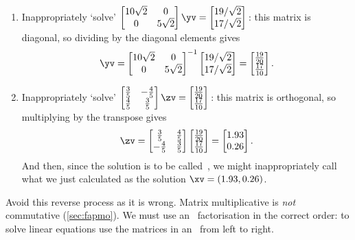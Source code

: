 \begin{example}
\begin{enumerate}
\item Inappropriately `solve' \(\begin{bmatrix} 10\sqrt2&0\\0&5\sqrt2 \end{bmatrix}\yv=\begin{bmatrix} 19/\sqrt2\\17/\sqrt2 \end{bmatrix}\)\,:  this matrix is diagonal, so dividing by the diagonal elements gives 
\begin{equation*}
\yv=\begin{bmatrix} 10\sqrt2&0\\0&5\sqrt2 \end{bmatrix}^{-1}
\begin{bmatrix} 19/\sqrt2\\17/\sqrt2 \end{bmatrix}
=\begin{bmatrix} \frac{19}{20}\\\frac{17}{10} \end{bmatrix}.
\end{equation*}

\item Inappropriately `solve' \(\begin{bmatrix} \frac35&-\frac45\\\frac45&\frac35 \end{bmatrix}\zv=\begin{bmatrix} \frac{19}{20}\\\frac{17}{10} \end{bmatrix}\)\,: this matrix is orthogonal, so multiplying by the transpose gives 
\begin{equation*}
\zv=\begin{bmatrix} \frac35&\frac45\\-\frac45&\frac35 \end{bmatrix}
\begin{bmatrix} \frac{19}{20}\\\frac{17}{10} \end{bmatrix}
=\begin{bmatrix} 1.93\\0.26 \end{bmatrix}.
\end{equation*}
And then, since the solution is to be called~\xv, we might inappropriately call what we just calculated as the solution \(\xv=(1.93,0.26)\).
\end{enumerate}
\end{example}
Avoid this reverse process as it is wrong.
Matrix multiplicative is \emph{not} commutative (\autoref{sec:fapmo}).  
We must use an \svd\ factorisation in the correct order: to solve linear equations use the matrices in an \svd\ from left to right.





